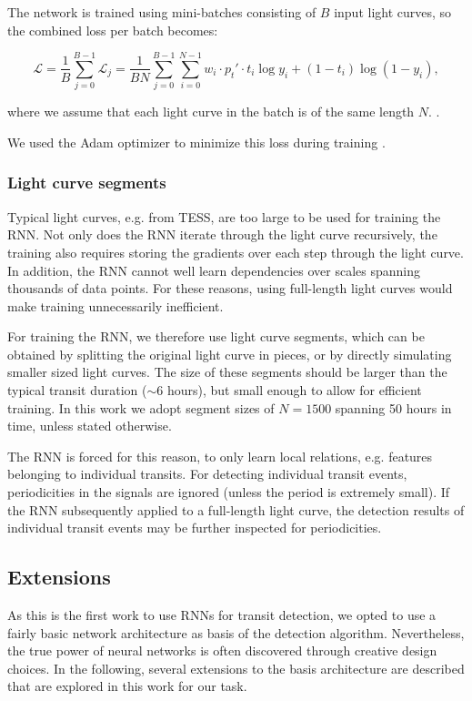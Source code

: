The network is trained using mini-batches consisting of $B$ input light curves, so the combined loss per batch becomes:

\begin{equation}
    \mathcal{L} = \frac{1}{B}  \sum_{j=0}^{B-1} \mathcal{L}_{j}  = \frac{1}{B N} \sum_{j=0}^{B-1} \sum_{i=0}^{N-1}  w_i \cdot p_t' \cdot t_i \log  y_i + (1-t_i) \log (1-y_i),
\end{equation}

\noindent where we assume that each light curve in the batch is of the same length $N$. . 

We used the Adam optimizer to minimize this loss during training \citep{kingma2014adam}.

\subsubsection{Light curve segments}
Typical light curves, e.g. from TESS, are too large to be used for training the RNN. Not only does the RNN iterate through the light curve recursively, the training also requires storing the gradients over each step through the light curve. In addition, the RNN cannot well learn dependencies over scales spanning thousands of data points. For these reasons, using full-length light curves would make training unnecessarily inefficient. 

For training the RNN, we therefore use light curve segments, which can be obtained by splitting the original light curve in pieces, or by directly simulating smaller sized light curves. The size of these segments should be larger than the typical transit duration ($\sim$6 hours), but small enough to allow for efficient training. In this work we adopt segment sizes of $N = 1500$ spanning 50 hours in time, unless stated otherwise.

The RNN is forced for this reason, to only learn local relations, e.g. features belonging to individual transits. For detecting individual transit events, periodicities in the signals are ignored (unless the period is extremely small). If the RNN subsequently applied to a full-length light curve, the detection results of individual transit events may be further inspected for periodicities.


\subsection{Extensions}
As this is the first work to use RNNs for transit detection, we opted to use a fairly basic network architecture as basis of the detection algorithm. Nevertheless, the true power of neural networks is often discovered through creative design choices. In the following, several extensions to the basis architecture are described that are explored in this work for our task.

